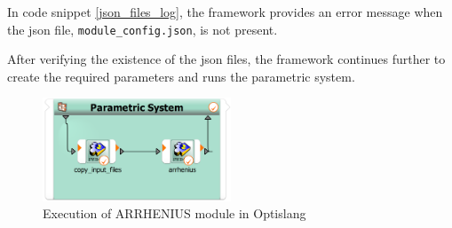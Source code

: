 In code snippet \ref{json_files_log}, the framework provides an error message when the \acrshort{json} file, \texttt{module\_config.json}, is not present.

After verifying the existence of the \acrshort{json} files, the framework continues further to create the required parameters and runs the parametric system.
\begin{figure}[!ht]
    \centering
    \includegraphics[width=0.5\textwidth]{Images/parametric_system_with_copy_actor.png}
    \caption{Execution of ARRHENIUS module in Optislang}
    \label{parametric_system_with_copy_actor}
  \end{figure}

